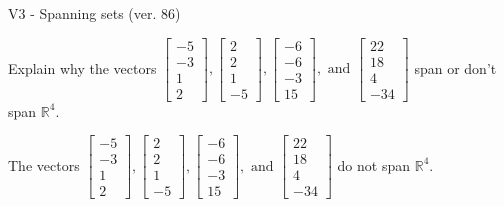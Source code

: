 \begin{exercise}
  \begin{exerciseTitle}V3 - Spanning sets (ver. 86)\end{exerciseTitle}
  \begin{exerciseStatement}
    Explain why the vectors \(\left[\begin{array}{r}
-5 \\
-3 \\
1 \\
2
\end{array}\right] , \left[\begin{array}{r}
2 \\
2 \\
1 \\
-5
\end{array}\right] , \left[\begin{array}{r}
-6 \\
-6 \\
-3 \\
15
\end{array}\right] , \text{ and } \left[\begin{array}{r}
22 \\
18 \\
4 \\
-34
\end{array}\right]\) span or don't span \(\mathbb{R}^4\). 
	


  \end{exerciseStatement}
  \begin{exerciseAnswer}
   The vectors \(\left[\begin{array}{r}
-5 \\
-3 \\
1 \\
2
\end{array}\right] , \left[\begin{array}{r}
2 \\
2 \\
1 \\
-5
\end{array}\right] , \left[\begin{array}{r}
-6 \\
-6 \\
-3 \\
15
\end{array}\right] , \text{ and } \left[\begin{array}{r}
22 \\
18 \\
4 \\
-34
\end{array}\right]\) 
  	 do not  
	span \(\mathbb{R}^4\).
  


  \end{exerciseAnswer}
\end{exercise}